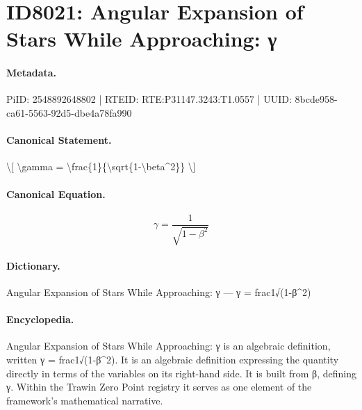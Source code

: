 \section*{ID8021: Angular Expansion of Stars While Approaching: γ}
\paragraph{Metadata.}
PiID: 2548892648802 | RTEID: RTE:P31147.3243:T1.0557 | UUID: 8bcde958-ca61-5563-92d5-dbe4a78fa990

\paragraph{Canonical Statement.}
\textbackslash{}[ \textbackslash{}gamma = \textbackslash{}frac\{1\}\{\textbackslash{}sqrt\{1-\textbackslash{}beta\textasciicircum{}2\}\} \textbackslash{}]

\paragraph{Canonical Equation.}
\[
\gamma = \frac{1}{\sqrt{1-\beta^2}}
\]

\paragraph{Dictionary.}
Angular Expansion of Stars While Approaching: γ — γ = frac1√(1-β\textasciicircum{}2)

\paragraph{Encyclopedia.}
Angular Expansion of Stars While Approaching: γ is an algebraic definition, written γ = frac1√(1-β\textasciicircum{}2). It is an algebraic definition expressing the quantity directly in terms of the variables on its right-hand side. It is built from β, defining γ. Within the Trawin Zero Point registry it serves as one element of the framework's mathematical narrative.
